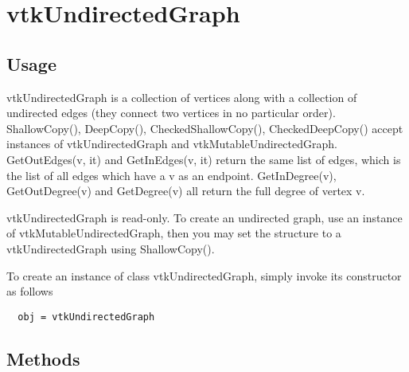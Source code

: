 \section{vtkUndirectedGraph}

\subsection{Usage}

 vtkUndirectedGraph is a collection of vertices along with a collection of
 undirected edges (they connect two vertices in no particular order). 
 ShallowCopy(), DeepCopy(), CheckedShallowCopy(), CheckedDeepCopy()
 accept instances of vtkUndirectedGraph and vtkMutableUndirectedGraph.
 GetOutEdges(v, it) and GetInEdges(v, it) return the same list of edges, 
 which is the list of all edges which have a v as an endpoint.
 GetInDegree(v), GetOutDegree(v) and GetDegree(v) all return the full
 degree of vertex v.

 vtkUndirectedGraph is read-only. To create an undirected graph,
 use an instance of vtkMutableUndirectedGraph, then you may set the
 structure to a vtkUndirectedGraph using ShallowCopy().


To create an instance of class vtkUndirectedGraph, simply
invoke its constructor as follows
\begin{verbatim}
  obj = vtkUndirectedGraph
\end{verbatim}
\subsection{Methods}

